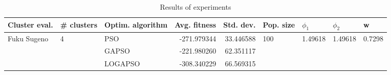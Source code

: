 \begin{table}
\centering
\caption{Results of experiments}
\begin{tabular}{lllrrllll}
\toprule
               Cluster eval. &        \# clusters & Optim. algorithm &  Avg. fitness &  Std. dev. &            Pop. size &               $\phi_{1}$ &               $\phi_{2}$ &                       w \\
\midrule
\multirow{3}{*}{Fuku Sugeno} & \multirow{3}{*}{4} &              PSO &   -271.979344 &  33.446588 & \multirow{3}{*}{100} & \multirow{3}{*}{1.49618} & \multirow{3}{*}{1.49618} & \multirow{3}{*}{0.7298} \\
                             &                    &            GAPSO &   -221.980260 &  62.351117 &                      &                          &                          &                         \\
                             &                    &          LOGAPSO &   -308.340229 &  66.569315 &                      &                          &                          &                         \\
\bottomrule
\end{tabular}
\end{table}
